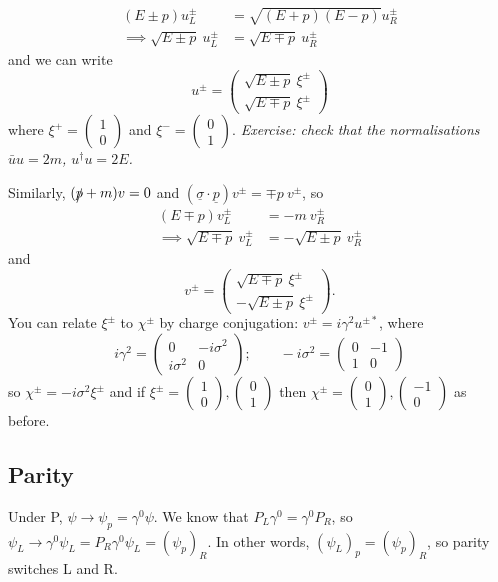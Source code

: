 \documentclass[a4paper,12pt]{article}
\newcommand{\icol}[1]{%
  \left(\begin{smallmatrix}#1\end{smallmatrix}\right)%
}
\begin{document}
\begin{equation}
\begin{split}
(E \pm p)u_L^\pm &= \sqrt{(E+p)(E-p)}u_R^\pm \\
\implies \sqrt{E\pm p}\ u_L^\pm &= \sqrt{E \mp p}\ u_R^\pm 
\end{split}
\end{equation}
and we can write
%
\[ u^\pm =
\left( \begin{array}{c}
\sqrt{E \pm p} \ \xi^\pm   \\
\sqrt{E \mp p} \ \xi^\pm  \end{array} \right) \] 
%
where $\xi^+ = \icol{1\\0}$ and $\xi^- = \icol{0\\1}$. 
\newline
\newline
\textit{Exercise: check that the normalisations $\bar{u}u = 2m$, $u^\dagger u = 2E$.}
\newline

Similarly, $(\slashed{p} +m)v = 0$ and $(\underline{\sigma}\cdot\underline{p})v^\pm = \mp p\ v^\pm$, so 
\begin{equation}
\begin{split}
(E \mp p)v_L^\pm &= -m\ v_R^\pm \\
\implies \sqrt{E\mp p}\ v_L^\pm &= -\sqrt{E \pm p}\ v_R^\pm 
\end{split}
\end{equation}
and
%
\[ v^\pm =
\left( \begin{array}{c}
\sqrt{E \mp p} \ \xi^\pm   \\
-\sqrt{E \pm p} \ \xi^\pm  \end{array} \right). \] 
%
You can relate $\xi^\pm$ to $\chi^\pm$ by charge conjugation: $v^\pm = i \gamma^2 u^{\pm *}$, where
%
\[ i\gamma^2 = \left( \begin{array}{cc}
0 & -i \sigma^2  \\
i\sigma^2 & 0  \end{array} \right); \qquad 
-i\sigma^2 = \left( \begin{array}{cc}
0 & -1 \\
1 & 0 \end{array} \right) \]
%
so $\chi^\pm = -i\sigma^2\xi^\pm$ and if $\xi^\pm = \icol{1\\0}, \icol{0\\1}$ then $\chi^\pm = \icol{0\\1}, \icol{-1\\0}$ as before.
%
\subsection{Parity}
%
Under P, $\psi \to \psi_p = \gamma^0\psi$. We know that $P_L \gamma^0 = \gamma^0 P_R$, so $\psi_L \to \gamma^0 \psi_L =  P_R\gamma^0 \psi_L = (\psi_p)_R$. In other words, $(\psi_L)_p = (\psi_p)_R$, so parity switches L and R.
\end{document}
